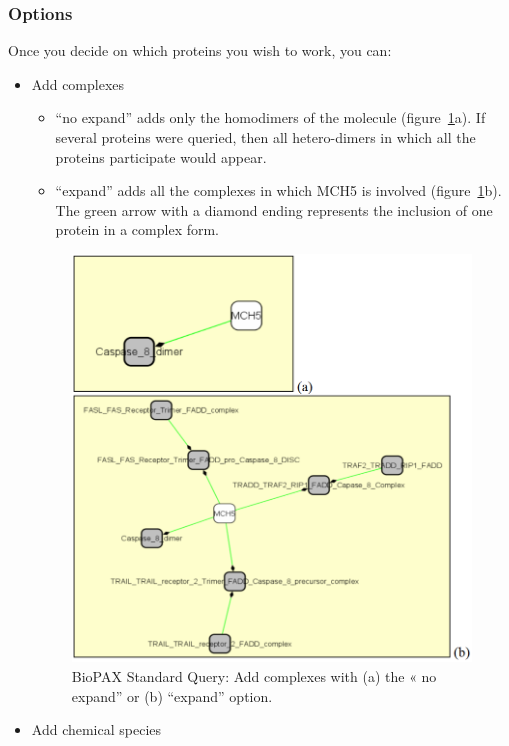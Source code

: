 \subsubsection{Options}
Once you decide on which proteins you wish to work, you can:
\begin{itemize}
\item Add complexes
\begin{itemize}
\item “no expand” adds only the homodimers of the molecule (figure~\ref{Standard_Query_Add_complexes}a). If several proteins were queried, then all hetero-dimers in which all the proteins participate would appear.
\item “expand” adds all the complexes in which MCH5 is involved (figure~\ref{Standard_Query_Add_complexes}b). The green arrow with a diamond ending represents the inclusion of one protein in a complex form.
\end{itemize}
\begin{figure}[h]
\centering
\includegraphics[width=18 cm]{graphics/Standard_Query_Add_complexes}
\caption{BioPAX Standard Query: Add complexes with (a) the « no expand” or (b) “expand” option.}
\label{Standard_Query_Add_complexes}
\end{figure}
\item Add chemical species\\

\end{itemize}
